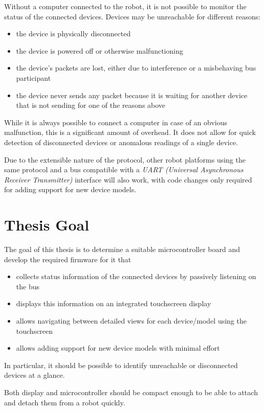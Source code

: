 Without a computer connected to the robot, it is not possible to monitor the status of the connected
devices. Devices may be unreachable for different reasons:

\begin{itemize}
    \item the device is physically disconnected
    \item the device is powered off or otherwise malfunctioning
    \item the device's packets are lost, either due to interference or a misbehaving bus participant
    \item the device never sends any packet because it is waiting for another device that is not sending
          for one of the reasons above
\end{itemize}

While it is always possible to connect a computer in case of an obvious malfunction, this is a
significant amount of overhead. It does not allow for quick detection of disconnected devices
or anomalous readings of a single device.

Due to the extensible nature of the protocol, other robot platforms using the same protocol and
a bus compatible with a \textit{UART (Universal Asynchronous Receiver Transmitter)} interface will
also work, with code changes only required for adding support for new device models.

\section{Thesis Goal}
\label{introduction/thesis-goal}

The goal of this thesis is to determine a suitable microcontroller board and develop
the required firmware for it that

\begin{itemize}
    \item collects status information of the connected devices by passively listening on the bus
    \item displays this information on an integrated touchscreen display
    \item allows navigating between detailed views for each device/model using the touchscreen
    \item allows adding support for new device models with minimal effort
\end{itemize}

In particular, it should be possible to identify unreachable or disconnected devices at a glance.

Both display and microcontroller should be compact enough to be able to attach and detach them
from a robot quickly.

